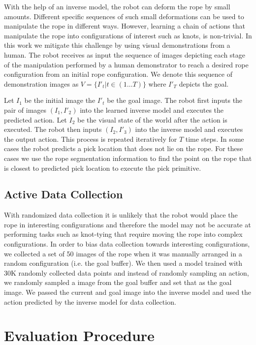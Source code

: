 \documentclass[letterpaper, 10 pt, conference]{ieeeconf}  %
\begin{document}
With the help of an inverse model, the robot can deform the rope by small amounts. Different specific sequences of such small deformations can be used to manipulate the rope in different ways. However, learning a chain of actions that manipulate the rope into configurations of interest such as knots, is non-trivial. In this work we mitigate this challenge by using visual demonstrations from a human. The robot receives as input the sequence of images depicting each stage of the manipulation performed by a human demonstrator to reach a desired rope configuration from an initial rope configuration. We denote this sequence of demonstration images as $V = \{I'_t | t \in (1\dots T)\} $ where $I'_T$ depicts the goal. 

Let $I_1$ be the initial image the $I'{_t}$ be the goal image. The robot first inputs the pair of images $(I_1, I'_2)$ into the learned inverse model and executes the predicted action.
Let $I_2$ be the visual state of the world after the action is executed. The robot then inputs $(I_2, I'_3)$ into the inverse model and executes the output action. This process is repeated iteratively for $T$ time steps. In some cases the robot predicts a pick location that does not lie on the rope. For these cases we use the rope segmentation information to find the point on the rope that is closest to predicted pick location to execute the pick primitive.

\subsection{Active Data Collection}
\label{sec:scaling}
With randomized data collection it is unlikely that the robot would place the rope in interesting configurations and therefore the model may not be accurate at performing tasks such as knot-tying that require moving the rope into complex configurations. In order to bias data collection towards interesting configurations, we collected a set of 50 images of the rope when it was manually arranged in a random configuration (i.e. the goal buffer). We then used a model trained with 30K randomly collected data points and instead of randomly sampling an action, we randomly sampled a image from the goal buffer and set that as the goal image. We passed the current and goal image into the inverse model and used the action predicted by the inverse model for data collection. 

\section{Evaluation Procedure}
\end{document}
